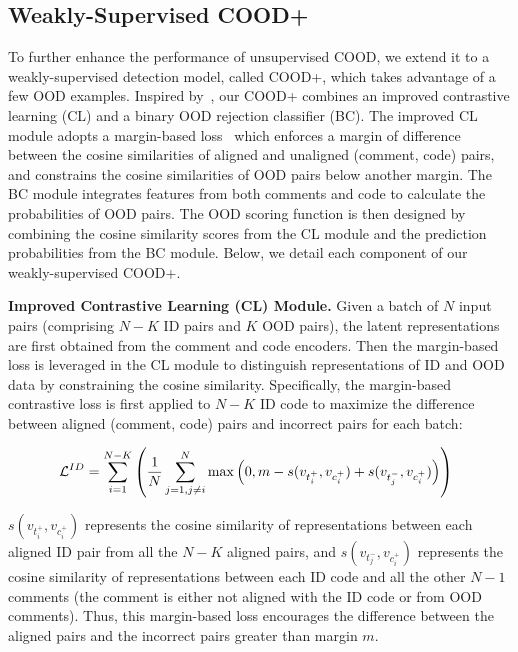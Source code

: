 \subsection{Weakly-Supervised COOD+}

To further enhance the performance of unsupervised COOD, we extend it to a weakly-supervised detection model, called COOD+, which takes advantage of a few OOD examples. Inspired by~\cite{duong2024general}, our COOD+ combines an improved contrastive learning (CL) and a binary OOD rejection classifier (BC). The improved CL module adopts a margin-based loss~\cite{xue2009svm} which enforces a margin of difference between the cosine similarities of aligned and unaligned (comment, code) pairs, and constrains the cosine similarities of OOD pairs below another margin. The BC module integrates features from both comments and code to calculate the probabilities of OOD pairs. The OOD scoring function is then designed by combining the cosine similarity scores from the CL module and the prediction probabilities from the BC module. Below, we detail each component of our weakly-supervised COOD+.

\textbf{Improved Contrastive Learning (CL) Module.} Given a batch of $N$ input pairs (comprising $N-K$ ID pairs and $K$ OOD pairs), the latent representations are first obtained from the comment and code encoders. Then the margin-based loss is leveraged in the CL module to distinguish representations of ID and OOD data by constraining the cosine similarity. Specifically, the margin-based contrastive loss is first applied to $N-K$ ID code to maximize the difference between aligned (comment, code) pairs and incorrect pairs for each batch: 


\begin{equation}\scriptsize
\label{eq:contrast_id}
    \hspace{-0.2cm} \mathcal{L}^{ID} = \sum_{i=1}^{N-K} \left(\frac{1}{N}\sum_{j=1, j \neq i}^N \max \left(0,m - s(v_{t_i^+}, v_{c_i^+}) + s(v_{t_j^-}, v_{c_i^+})\right)\right)
\end{equation}


\noindent $s(v_{t_i^+}, v_{c_i^+})$ represents the cosine similarity of representations between each aligned ID pair from all the $N-K$ aligned pairs, and $s(v_{t_j^-},v_{c_i^+})$ represents the cosine similarity of representations between each ID code and all the other $N-1$ comments (\ie the comment is either not aligned with the ID code or from OOD comments). Thus, this margin-based loss encourages the difference between the aligned pairs and the incorrect pairs greater than margin $m$. 

